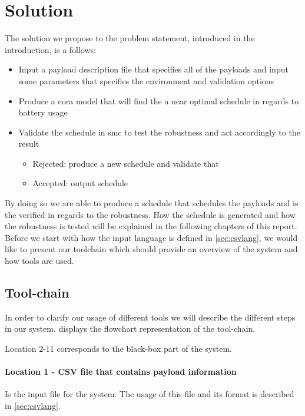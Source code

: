\section{Solution} \label{sec:solution}
The solution we propose to the problem statement, introduced in the introduction, is a follows:
\begin{itemize}
	\item	Input a payload description file that specifies all of the payloads and input some parameters that specifies the environment and validation options
	\item	Produce a \gls{cora} model that will find the a near optimal schedule in regards to battery usage 
	\item	Validate the schedule in \gls{smc} to test the robustness and act accordingly to the result
	\begin{itemize}
		\item	Rejected: produce a new schedule and validate that
		\item	Accepted: output schedule
	\end{itemize}
\end{itemize}

By doing so we are able to produce a schedule that schedules the payloads and is the verified in regards to the robustness.
How the schedule is generated and how the robustness is tested will be explained in the following chapters of this report.
Before we start with how the input language is defined in \cref{sec:csvlang}, we would like to present our toolchain which should provide an overview of the system and how tools are used.

\subsection{Tool-chain} \label{subsec:tool_chainv}
In order to clarify our usage of different tools we will describe the different steps in our system. 
 displays the flowchart representation of the tool-chain.

Location 2-11 corresponds to the black-box part of the system.

\paragraph{Location 1 - CSV file that contains payload information} 
Is the input file for the system. 
The usage of this file and its format is described in \cref{sec:csvlang}.

